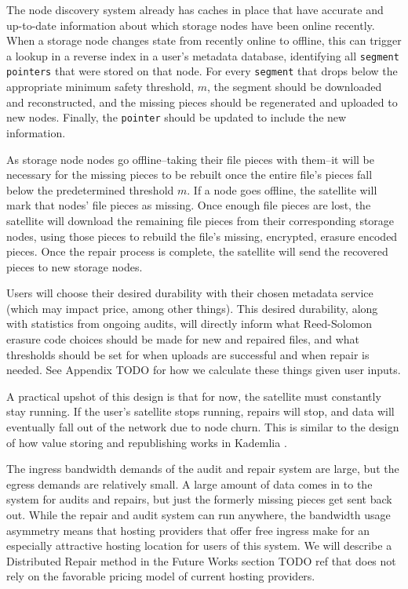 \documentclass[a4paper,10pt]{article} \usepackage[utf8]{inputenc}
\newcommand{\x}[1]{{\tt #1}} \newcommand{\code}[1]{{\tt #1}}
\newcommand{\todo}[1]{{\color{red} TODO #1 }}
\begin{document}
The node discovery system already has caches in place that have accurate and
up-to-date information about which storage nodes have been online recently.
When a storage node changes state from recently online to offline, this can
trigger a lookup in a reverse index in a user's metadata database, identifying
all \x{segment} \x{pointers} that were stored on that node.
For every \x{segment} that drops below the appropriate minimum safety
threshold, $m$, the segment should be downloaded and reconstructed, and the
missing pieces should be regenerated and uploaded to new nodes. Finally, the
\x{pointer} should be updated to include the new information.

As storage node nodes go offline--taking their file pieces with them--it will
be necessary for the missing pieces to be rebuilt once the entire file's pieces
fall below the predetermined threshold $m$. If a node goes offline, the
satellite will mark that nodes' file pieces as missing.
Once enough file pieces are lost, the satellite will download the
remaining file pieces from their corresponding storage nodes, using those
pieces
to rebuild the file's missing, encrypted, erasure encoded pieces.
Once the repair process is complete, the satellite will send the
recovered pieces to new storage nodes.

Users will choose their desired durability with their chosen metadata service
(which may impact price, among other things). This desired durability, along
with
statistics from ongoing audits, will directly inform what Reed-Solomon erasure
code choices should be made for new and repaired files, and what thresholds
should be set for when uploads are successful and when repair is needed. See
Appendix \todo{} for how we calculate these things given user inputs.

A practical upshot of this design is that for now, the satellite must
constantly stay running. If the user's satellite stops running, repairs will
stop, and data will eventually fall out of the network due to node churn. This
is similar to the design of how value storing and republishing works in
Kademlia \cite{kad}.

The ingress bandwidth demands of the audit and repair system are large, but the
egress demands are relatively small. A large amount of data comes in to the
system for audits and repairs, but just the formerly missing pieces get sent
back out.
While the repair and audit system can run anywhere, the bandwidth usage
asymmetry means that hosting providers that offer free ingress
make for an especially attractive hosting location for users of this system.
We will describe a Distributed Repair method in the Future Works section
\todo{ref} that
does not rely on the favorable pricing model of current hosting providers.
\end{document}
